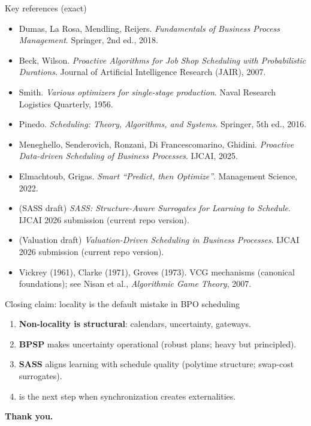 \documentclass[aspectratio=169,10pt]{beamer}
\newif\iflong
\newcommand{\btext}[1]{\textbf{\color{darkred}#1}}
\begin{document}
\begin{frame}{Key references (exact)}
  \scriptsize
  \begin{itemize}
    \item Dumas, La Rosa, Mendling, Reijers. \emph{Fundamentals of Business Process Management}. Springer, 2nd ed., 2018.
    \item Beck, Wilson. \emph{Proactive Algorithms for Job Shop Scheduling with Probabilistic Durations}. Journal of Artificial Intelligence Research (JAIR), 2007.
    \item Smith. \emph{Various optimizers for single-stage production}. Naval Research Logistics Quarterly, 1956. %
    \item Pinedo. \emph{Scheduling: Theory, Algorithms, and Systems}. Springer, 5th ed., 2016.
    \item Meneghello, Senderovich, Ronzani, Di Francescomarino, Ghidini. \emph{Proactive Data-driven Scheduling of Business Processes}. IJCAI, 2025.
    \item Elmachtoub, Grigas. \emph{Smart ``Predict, then Optimize''}. Management Science, 2022.
    \item (SASS draft) \emph{SASS: Structure-Aware Surrogates for Learning to Schedule}. IJCAI 2026 submission (current repo version).
    \item (Valuation draft) \emph{Valuation-Driven Scheduling in Business Processes}. IJCAI 2026 submission (current repo version).
    \item Vickrey (1961), Clarke (1971), Groves (1973). VCG mechanisms (canonical foundations); see Nisan et al., \emph{Algorithmic Game Theory}, 2007.
  \end{itemize}
\end{frame}

\begin{frame}{Closing claim: locality is the default mistake in BPO scheduling}
  \begin{enumerate}
    \item \btext{Non-locality is structural}: calendars, uncertainty, gateways.
    \item \btext{BPSP} makes uncertainty operational (robust plans; heavy but principled).
    \item \btext{SASS} aligns learning with schedule quality (polytime structure; swap-cost surrogates).
    \item \iflong\btext{Valuation} internalizes externalities (synchronization + incentives) as the capstone.\else{} is the next step when synchronization creates externalities.\fi
  \end{enumerate}
  \vspace{0.25cm}
  \btext{Thank you.}
\end{frame}
\end{document}
